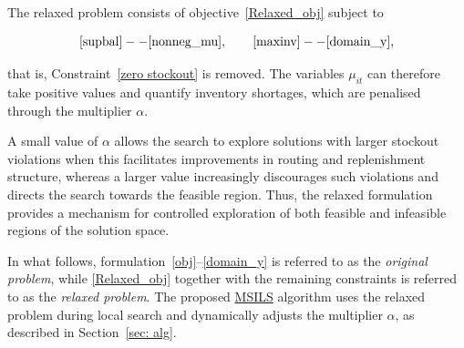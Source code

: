 \documentclass{article}
\begin{document}
The relaxed problem consists of objective~\eqref{Relaxed_obj} subject to

\[
\eqref{supbal}--\eqref{nonneg_mu},
\qquad
\eqref{maxinv}--\eqref{domain_y},
\]

that is, Constraint~\eqref{zero stockout} is removed. The variables
$\mu_{it}$ can therefore take positive values and quantify inventory
shortages, which are penalised through the multiplier $\alpha$.

A small value of $\alpha$ allows the search to explore solutions with larger
stockout violations when this facilitates improvements in routing and
replenishment structure, whereas a larger value increasingly discourages
such violations and directs the search towards the feasible region. Thus,
the relaxed formulation provides a mechanism for controlled exploration of
both feasible and infeasible regions of the solution space.

In what follows, formulation~\eqref{obj}--\eqref{domain_y} is referred to as
the \emph{original problem}, while
\eqref{Relaxed_obj} together with the remaining constraints is referred to as
the \emph{relaxed problem}. The proposed \hyperref[alg:MSILS]{MSILS} algorithm uses the relaxed
problem during local search and dynamically adjusts the multiplier $\alpha$,
as described in Section~\ref{sec: alg}.
\end{document}

